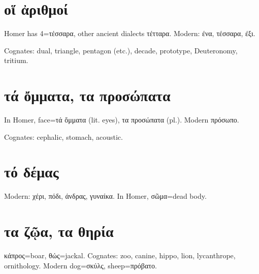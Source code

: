 \documentclass[12pt,openany]{book}
\newenvironment{notes}{\vfill\scriptsize\begin{flushright}}{\end{flushright}}
\newcommand{\fig}[1]{\begin{center}\end{center}}
\begin{document}

\chapter{οἵ ἀριθμοί}

\fig{numbers/numbers.svg}

\begin{notes}
Homer has 4=τέσσαρα, other ancient dialects τέτταρα.
Modern: ένα, τέσσαρα, έξι.

Cognates: dual, triangle, pentagon (etc.), decade,
prototype, Deuteronomy, tritium.
\end{notes}


\chapter{τά ὄμματα, τα προσώπατα}

\fig{face/face.svg}

\begin{notes}
In Homer, face=τά ὄμματα (lit. eyes), τα προσώπατα (pl.).
Modern πρόσωπο.

Cognates: cephalic, stomach,
acoustic.
\end{notes}


\chapter{τό δέμας}

\fig{body/body.svg}

\begin{notes}
Modern: χέρι, πόδι, άνδρας, γυναίκα. In Homer, σῶμα=dead body.
\end{notes}


\chapter{τα ζῷα, τα θηρία}

\fig{animals/animals.svg}

\begin{notes}
κάπρος=boar,  θώς=jackal. Cognates: zoo, canine, hippo, lion, lycanthrope, ornithology.
Modern dog=σκύλς, sheep=πρόβατο.
\end{notes}
\end{document}
